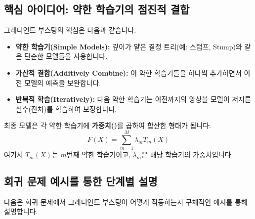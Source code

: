 \documentclass[11pt,a4paper]{article}
\theoremstyle{definition}
\begin{document}
\subsection{핵심 아이디어: 약한 학습기의 점진적 결합}
그래디언트 부스팅의 핵심은 다음과 같습니다.
\begin{itemize}
    \item \textbf{약한 학습기(Simple Models):} 깊이가 얕은 결정 트리(예: 스텀프, Stump)와 같은 단순한 모델들을 사용합니다.
    \item \textbf{가산적 결합(Additively Combine):} 이 약한 학습기들을 하나씩 추가하면서 이전 모델의 예측을 보완합니다.
    \item \textbf{반복적 학습(Iteratively):} 다음 약한 학습기는 이전까지의 앙상블 모델이 저지른 실수(잔차)를 학습하여 보정합니다.
\end{itemize}
최종 모델은 각 약한 학습기에 \textbf{가중치(\texttt{\lambda})}를 곱하여 합산한 형태가 됩니다:
\[ F(X) = \sum_{m=1}^{M} \lambda_m T_m(X) \]
여기서 $T_m(X)$는 $m$번째 약한 학습기이고, $\lambda_m$은 해당 학습기의 가중치입니다.

\subsection{회귀 문제 예시를 통한 단계별 설명}
다음은 회귀 문제에서 그래디언트 부스팅이 어떻게 작동하는지 구체적인 예시를 통해 설명합니다.
\end{document}
